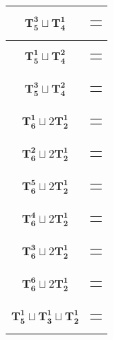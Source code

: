 \documentclass{article}
\begin{document}
\begin{longtable}{|c|c|}
    $\mathbf{T_{5}^{3}} \sqcup \mathbf{T_{4}^{1}}$ & \begin{tabular}{@{}l@{}} $(6,0,3,4,5)\sqcup(8,7,9,2)$ \end{tabular} \\ \hline
    $\mathbf{T_{5}^{1}} \sqcup \mathbf{T_{4}^{2}}$ & \begin{tabular}{@{}l@{}} $(4,8,1,7,2)\sqcup(10,9,11,12)$ \end{tabular} \\ \hline
    $\mathbf{T_{5}^{3}} \sqcup \mathbf{T_{4}^{2}}$ & \begin{tabular}{@{}l@{}} $(6,0,3,4,5)\sqcup(8,9,2,7)$ \end{tabular} \\ \hline
    $\mathbf{T_{6}^{1}} \sqcup 2\mathbf{T_{2}^{1}}$ & \begin{tabular}{@{}l@{}} $(0,6,1,5,2,9)\sqcup(8,10)\sqcup(3,4)$ \end{tabular} \\ \hline
    $\mathbf{T_{6}^{2}} \sqcup 2\mathbf{T_{2}^{1}}$ & \begin{tabular}{@{}l@{}} $(3,6,1,8,4,0)\sqcup(5,7)\sqcup(9,10)$ \end{tabular} \\ \hline
    $\mathbf{T_{6}^{5}} \sqcup 2\mathbf{T_{2}^{1}}$ & \begin{tabular}{@{}l@{}} $(4,1,8,3,5,7)\sqcup(0,2)\sqcup(9,10)$ \end{tabular} \\ \hline
    $\mathbf{T_{6}^{4}} \sqcup 2\mathbf{T_{2}^{1}}$ & \begin{tabular}{@{}l@{}} $(5,8,4,1,6,7)\sqcup(0,2)\sqcup(9,10)$ \end{tabular} \\ \hline
    $\mathbf{T_{6}^{3}} \sqcup 2\mathbf{T_{2}^{1}}$ & \begin{tabular}{@{}l@{}} $(5,11,9,12,7,10)\sqcup(8,1)\sqcup(0,4)$ \end{tabular} \\ \hline
    $\mathbf{T_{6}^{6}} \sqcup 2\mathbf{T_{2}^{1}}$ & \begin{tabular}{@{}l@{}} $(4,1,8,5,6,7)\sqcup(2,3)\sqcup(9,11)$ \end{tabular} \\ \hline
    $\mathbf{T_{5}^{1}} \sqcup \mathbf{T_{3}^{1}} \sqcup \mathbf{T_{2}^{1}}$ & \begin{tabular}{@{}l@{}} $(0,6,1,5,2)\sqcup(8,10,9)\sqcup(11,4)$ \end{tabular} \\ \hline

\end{longtable}
\end{document}
